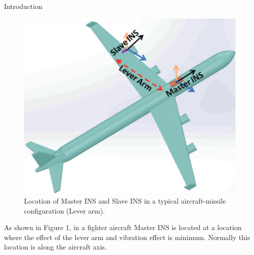 \documentclass[final]{beamer}
\newlength{\colwidth}
\begin{document}
\begin{frame}[t]
\begin{columns}[t]
\begin{column}{\colwidth}
\begin{block}{Introduction}
\lipsum
\begin{figure}
    \centering
    \includegraphics[width=1.0\textwidth]{logos/sambhav1.png}
    \caption{  Location of  Master  INS  and  Slave  INS  in a  typical aircraft-missile configuration (Lever arm).}
    \label{fig:img1}
\end{figure}
\lipsum

\par As shown in Figure 1, in a fighter aircraft Master INS is located at a location where the effect of the lever arm and vibration effect is minimum. Normally this location is along the aircraft axis.


\end{block}
\end{column}
\end{columns}
\end{frame}
\end{document}

